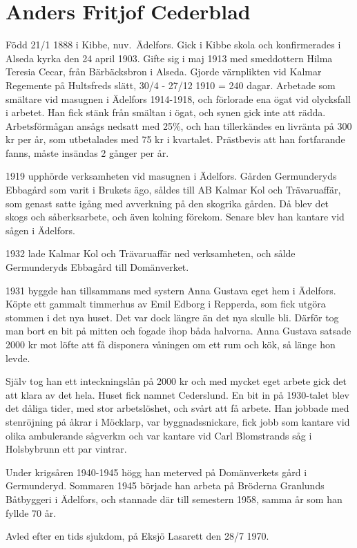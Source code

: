 \chapter{Anders Fritjof Cederblad}
\label{anders_fritjof_cederblad}
Född 21/1 1888 i Kibbe, nuv.~Ädelfors. Gick i Kibbe skola och konfirmerades i Alseda kyrka den 24 april 1903. Gifte sig i maj 1913 med smeddottern Hilma Teresia Cecar, från Bärbäcksbron i Alseda.
Gjorde värnplikten vid Kalmar Regemente på Hultsfreds slätt, 30/4 - 27/12 1910 = 240 dagar. Arbetade som smältare vid masugnen i Ädelfors 1914-1918, och förlorade ena ögat vid olycksfall i arbetet. Han fick stänk från smältan i ögat, och synen gick inte att rädda. Arbetsförmågan ansågs nedsatt med 25\%, och han tillerkändes en livränta på 300 kr per år, som utbetalades med 75 kr i kvartalet. Prästbevis att han fortfarande fanns, måste insändas 2 gånger per år.

1919 upphörde verksamheten vid masugnen i Ädelfors. Gården Germunderyds Ebbagård som varit i Brukets ägo, såldes till AB Kalmar Kol och Trävaruaffär, som genast satte igång med avverkning på den skogrika gården. Då blev det skogs och såberksarbete, och även kolning förekom. Senare blev han kantare vid sågen i Ädelfors.

1932 lade Kalmar Kol och Trävaruaffär ned verksamheten, och sålde Germunderyds Ebbagård till Domänverket.

1931 byggde han tillsammans med systern Anna Gustava eget hem i Ädelfors. Köpte ett gammalt timmerhus av Emil Edborg i Repperda, som fick utgöra stommen i det nya huset. Det var dock längre än det nya skulle bli. Därför tog man bort en bit på mitten och fogade ihop båda halvorna. Anna Gustava satsade 2000 kr mot löfte att få disponera våningen om ett rum och kök, så länge hon levde.

Själv tog han ett inteckningslån på 2000 kr och med mycket eget arbete gick det att klara av det hela. Huset fick namnet Cederslund. En bit in på 1930-talet blev det dåliga tider, med stor arbetslöshet, och svårt att få arbete. Han jobbade med stenröjning på åkrar i Möcklarp, var byggnadssnickare, fick jobb som kantare vid olika ambulerande sågverkm och var kantare vid Carl Blomstrands såg i Holsbybrunn ett par vintrar.

Under krigsåren 1940-1945 högg han meterved på Domänverkets gård i Germunderyd.
Sommaren 1945 började han arbeta på Bröderna Granlunds Båtbyggeri i Ädelfors, och stannade där till semestern 1958, samma år som han fyllde 70 år.

Avled efter en tids sjukdom, på Eksjö Lasarett den 28/7 1970.

